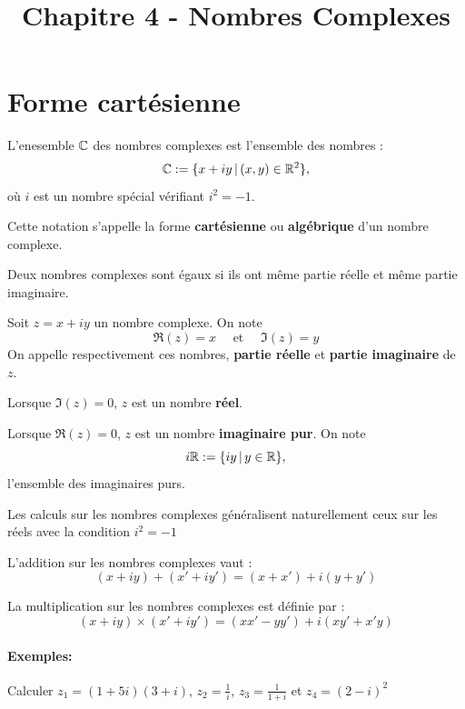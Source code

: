 \documentclass[a4paper, 11pt]{article}
\newcommand{\type}{Chapitre}
\newcommand{\numero}{ 4 }
\newcommand{\titre}{ Nombres Complexes }
\begin{document}
    \title{\type \numero - \titre }
\tableofcontents




\section{Forme cartésienne}
\begin{defi}
L'enesemble $\mathbb{C}$ des nombres complexes est l'ensemble des nombres : 
$$\mathbb{C} := \{ x+iy \, |\, (x,y)\in \mathbb{R}^2\},$$
où $i$ est un nombre spécial vérifiant $i^2=-1$. 
\end{defi}
\begin{remarques}
\item Cette notation s'appelle la forme \textbf{cartésienne} ou \textbf{algébrique} d'un nombre complexe. 
\item Deux nombres complexes sont égaux si ils ont même partie réelle et même partie imaginaire. 
\end{remarques}


\begin{defi}
Soit $z=x+iy$ un nombre complexe. On note 
$$\Re(z) =x \quad \text{ et }\quad  \Im(z) =y$$
On appelle respectivement ces nombres, \textbf{partie réelle} et \textbf{partie imaginaire} de $z$. 

\end{defi}
\begin{remarques}
\item Lorsque $\Im(z)=0$, $z$ est un nombre \textbf{réel}. 
\item Lorsque $\Re(z)=0$, $z$ est un nombre \textbf{imaginaire pur}. On note 
$$i\mathbb{R} := \{ iy\, |\, y\in \mathbb{R}\},$$ 
l'ensemble des imaginaires purs.
\end{remarques}





Les calculs sur les nombres complexes généralisent naturellement ceux sur les  réels avec la condition $i^2=-1$
\begin{prop}
L'addition sur les nombres complexes vaut : 
$$(x+iy)+(x'+iy') = (x+x')+i(y+y')$$

La multiplication sur les nombres complexes est définie par : 
$$(x+iy)\times (x'+iy') = (xx'-yy')+i(xy'+x'y)$$
\end{prop}

\paragraph{Exemples:}
Calculer $z_1=(1+5i)(3+i)$, $z_2 =\frac{1}{i}$, $z_3 =\frac{1}{1+i}$ et $z_4 =(2-i)^2$
\end{document}
